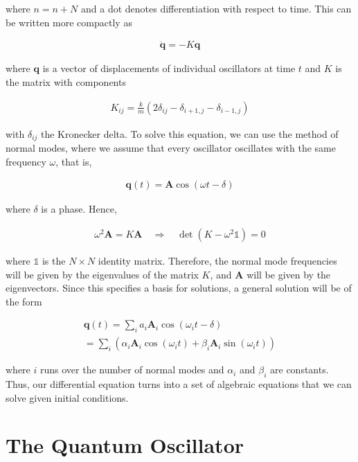 \documentclass[pre,floatfix,onecolumn]{revtex4-2}
\begin{document}
where $n=n+N$ and a dot denotes differentiation with respect to time. This can be written more compactly as

\begin{align}
\ddot{\mathbf{q}} = -K \mathbf{q}
\end{align}

where $\mathbf{q}$ is a vector of displacements of individual oscillators at time $t$ and $K$ is the matrix with components

\begin{align}
K_{i j} = \frac{k}{m}\left(2 \delta_{i j} - \delta_{i+1, j} - \delta_{i-1, j}\right)
\end{align}

with $\delta_{i j}$ the Kronecker delta. To solve this equation, we can use the method of normal modes, where we assume that every oscillator oscillates with the same frequency $\omega$, that is,

\begin{align}
\mathbf{q}(t) = \mathbf{A} \cos (\omega t-\delta)
\end{align}

where $\delta$ is a phase. Hence,

\begin{align}
\omega^{2} \mathbf{A} = K \mathbf{A} \quad \Rightarrow \quad \operatorname{det}\left(K-\omega^{2} \mathbb{1}\right) = 0
\end{align}

where $\mathbb{1}$ is the $N \times N$ identity matrix. Therefore, the normal mode frequencies will be given by the eigenvalues of the matrix $K$, and $\mathbf{A}$ will be given by the eigenvectors. Since this specifies a basis for solutions, a general solution will be of the form

\begin{align}
\mathbf{q}(t) = \sum_{i} a_{i} \mathbf{A}_{i} \cos \left(\omega_{i} t-\delta\right) \\
= \sum_{i} \left(\alpha_{i} \mathbf{A}_{i} \cos \left(\omega_{i} t\right) + \beta_{i} \mathbf{A}_{i} \sin \left(\omega_{i} t\right)\right)
\end{align}

where $i$ runs over the number of normal modes and $\alpha_{i}$ and $\beta_{i}$ are constants. Thus, our differential equation turns into a set of algebraic equations that we can solve given initial conditions.

\section{The Quantum Oscillator}
\end{document}
